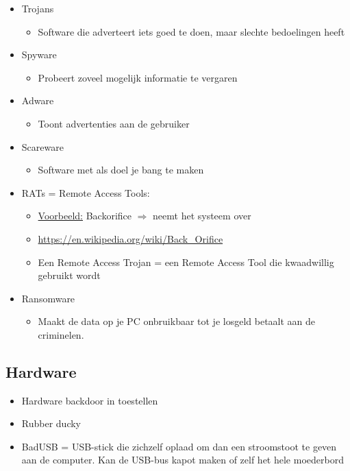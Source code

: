 \documentclass{article}
\begin{document}
\begin{itemize}
    \item Trojans
    \begin{itemize}
        \item Software die adverteert iets goed te doen, maar slechte bedoelingen heeft
    \end{itemize}
    \item Spyware
    \begin{itemize}
        \item Probeert zoveel mogelijk informatie te vergaren
    \end{itemize}
    \item Adware
    \begin{itemize}
        \item Toont advertenties aan de gebruiker
    \end{itemize}
    \item Scareware
    \begin{itemize}
        \item Software met als doel je bang te maken
    \end{itemize}
    \item RATs = Remote Access Tools:
    \begin{itemize}
        \item \underline{Voorbeeld:} Backorifice $\Rightarrow$ neemt het systeem over
        \item \url{https://en.wikipedia.org/wiki/Back\_Orifice}
        \item Een Remote Access Trojan = een Remote Access Tool die kwaadwillig gebruikt wordt
    \end{itemize}
    \item Ransomware
    \begin{itemize}
        \item Maakt de data op je PC onbruikbaar tot je losgeld betaalt aan de criminelen.
    \end{itemize}
\end{itemize}


\subsection{Hardware}
\begin{itemize}
    \item Hardware backdoor in toestellen
    \item Rubber ducky
    \item BadUSB = USB-stick die zichzelf oplaad om dan een stroomstoot te geven aan de computer. Kan de USB-bus kapot maken of zelf het hele moederbord
\end{itemize}
\end{document}
